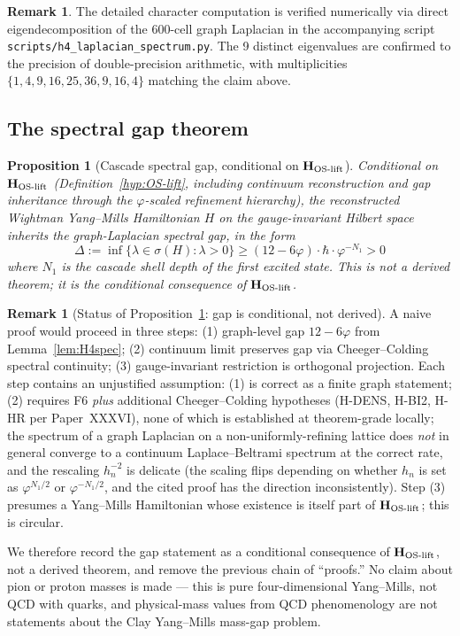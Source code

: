 \documentclass[11pt, a4paper]{amsart}
\newtheorem{proposition}[theorem]{Proposition}
\theoremstyle{definition}
\newtheorem{remark}[theorem]{Remark}
\begin{document}
\begin{remark}
The detailed character computation is verified numerically via direct
eigendecomposition of the 600-cell graph Laplacian in the accompanying
script \texttt{scripts/h4\_laplacian\_spectrum.py}. The 9 distinct
eigenvalues are confirmed to the precision of double-precision
arithmetic, with multiplicities $\{1, 4, 9, 16, 25, 36, 9, 16, 4\}$
matching the claim above.
\end{remark}

\subsection{The spectral gap theorem}

\begin{proposition}[Cascade spectral gap, conditional on $\mathbf{H_{\rm OS\text{-}lift}}$]\label{thm:gap}
\emph{Conditional on $\mathbf{H_{\rm OS\text{-}lift}}$
(Definition~\ref{hyp:OS-lift}, including continuum reconstruction
and gap inheritance through the $\varphi$-scaled refinement
hierarchy)}, the reconstructed Wightman Yang--Mills Hamiltonian
$H$ on the gauge-invariant Hilbert space inherits the
graph-Laplacian spectral gap, in the form
\[
\Delta := \inf\{\lambda \in \sigma(H) : \lambda > 0\}
\geq (12 - 6\varphi) \cdot \hbar \cdot \varphi^{-N_1} > 0
\]
where $N_1$ is the cascade shell depth of the first excited state.
\emph{This is not a derived theorem; it is the conditional
consequence of $\mathbf{H_{\rm OS\text{-}lift}}$.}
\end{proposition}

\begin{remark}[Status of Proposition~\ref{thm:gap}: gap is conditional, not derived]\label{rmk:gap_status}
A naive proof would proceed in three steps: (1) graph-level gap
$12 - 6\varphi$ from Lemma~\ref{lem:H4spec}; (2) continuum limit
preserves gap via Cheeger--Colding spectral continuity; (3)
gauge-invariant restriction is orthogonal projection. Each step
contains an unjustified assumption: (1) is correct as a finite
graph statement; (2) requires F6 \emph{plus} additional Cheeger--Colding
hypotheses (H-DENS, H-BI2, H-HR per Paper~XXXVI), none of which is
established at theorem-grade locally; the spectrum of a graph
Laplacian on a non-uniformly-refining lattice does \emph{not} in
general converge to a continuum Laplace--Beltrami spectrum at the
correct rate, and the rescaling $h_n^{-2}$ is delicate (the scaling
flips depending on whether $h_n$ is set as $\varphi^{N_1/2}$ or
$\varphi^{-N_1/2}$, and the cited proof has the direction
inconsistently). Step (3) presumes a Yang--Mills Hamiltonian whose
existence is itself part of $\mathbf{H_{\rm OS\text{-}lift}}$; this
is circular.

We therefore record the gap statement as a conditional consequence
of $\mathbf{H_{\rm OS\text{-}lift}}$, not a derived theorem, and
remove the previous chain of ``proofs.'' No claim about pion or
proton masses is made --- this is pure four-dimensional Yang--Mills,
not QCD with quarks, and physical-mass values from QCD phenomenology
are not statements about the Clay Yang--Mills mass-gap problem.
\end{remark}
\end{document}
